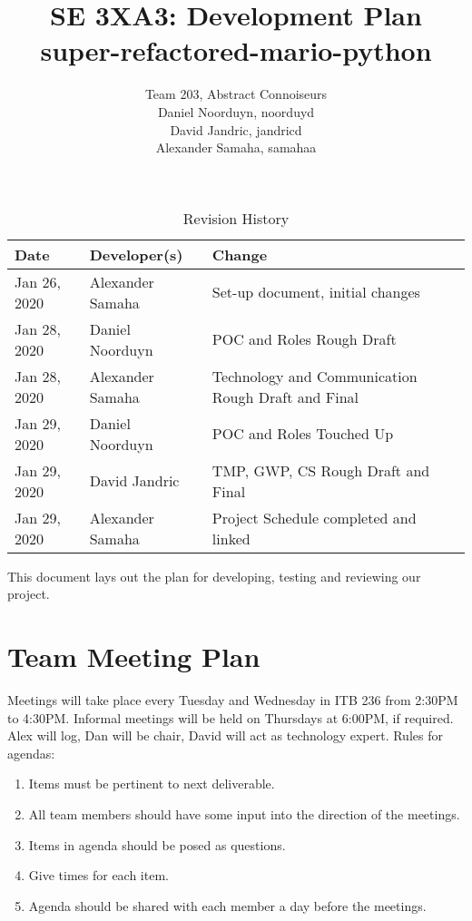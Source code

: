 \documentclass{article}
\title{SE 3XA3: Development Plan\\super-refactored-mario-python}
\author{Team 203, Abstract Connoiseurs\\
Daniel Noorduyn, noorduyd\\
David Jandric, jandricd\\
Alexander Samaha, samahaa\\
}
\date{}
\begin{document}
\begin{table}[hp]
\caption{Revision History} \label{TblRevisionHistory}
\begin{tabularx}{\textwidth}{llX}
\toprule
\textbf{Date} & \textbf{Developer(s)} & \textbf{Change}\\
\midrule
Jan 26, 2020 & Alexander Samaha & Set-up document, initial changes\\
Jan 28, 2020 & Daniel Noorduyn & POC and Roles Rough Draft\\
Jan 28, 2020 & Alexander Samaha & Technology and Communication Rough Draft and Final\\
Jan 29, 2020 & Daniel Noorduyn & POC and Roles Touched Up\\
Jan 29, 2020 & David Jandric & TMP, GWP, CS Rough Draft and Final\\
Jan 29, 2020 & Alexander Samaha & Project Schedule completed and linked\\
\bottomrule
\end{tabularx}
\end{table}

\newpage

\maketitle

This document lays out the plan for developing, testing and reviewing our
project.

\section{Team Meeting Plan}

Meetings will take place every Tuesday and Wednesday in ITB 236 from 2:30PM to
4:30PM. Informal meetings will be held on Thursdays at 6:00PM, if required.
Alex will log, Dan will be chair, David will act as technology expert.
Rules for agendas:
\begin{enumerate}
    \item Items must be pertinent to next deliverable.
    \item All team members should have some input into the direction of the meetings.
    \item Items in agenda should be posed as questions.
    \item Give times for each item.
    \item Agenda should be shared with each member a day before the meetings.
\end{enumerate}
\end{document}
